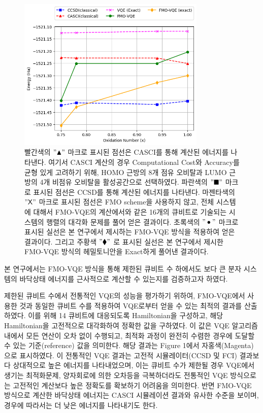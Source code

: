 \documentclass[pdflatex,sn-mathphys-num]{sn-jnl}%
\theoremstyle{thmstyleone}%
\theoremstyle{thmstyletwo}%
\theoremstyle{thmstylethree}%
\begin{document}
\begin{figure}[htbp]
\centering
\includegraphics[width=0.8\textwidth]{fig/result2.png}
\caption{빨간색의 $"\blacktriangle"$ 마크로 표시된 점선은 CASCI를 통해 계산된 에너지를 나타낸다. 여기서 CASCI 계산의 경우 Computational Cost와 Accuracy를 균형 있게 고려하기 위해, HOMO 근방의 8개 점유 오비탈과 LUMO 근방의 4개 비점유 오비탈을 활성공간으로 선택하였다. 
파란색의 $"\blacksquare"$ 마크로 표시된 점선은 CCSD를 통해 계산된 에너지를 나타낸다. 
마젠타색의 $"\mathsf{X} "$ 마크로 표시된 점선은 FMO scheme을 사용하지 않고, 전체 시스템에 대해서 FMO-VQE의 계산에서와 같은 16개의 큐비트로 기술되는 시스템의 행렬의 대각화 문제를 풀어 얻은 결과이다. 
초록색의 $"\bullet  "$ 마크로 표시된 실선은 본 연구에서 제시하는 FMO-VQE 방식을 적용하여 얻은 결과이다. 
그리고 주황색 $"\blacklozenge "$ 로 표시된 실선은 본 연구에서 제시한 FMO-VQE 방식의 헤밀토니안을 Exact하게 풀어낸 결과이다.}\label{Fig.5}
\end{figure}

본 연구에서는 FMO-VQE 방식을 통해 제한된 큐비트 수 하에서도 보다 큰 분자 시스템의 바닥상태 에너지를 근사적으로 계산할 수 있는지를 검증하고자 하였다. 

제한된 큐비트 수에서 전통적인 VQE의 성능을 평가하기 위하여, FMO-VQE에서 사용한 것과 동일한 큐비트 수를 적용하여 VQE로부터 얻을 수 있는 최적의 결과를 산출하였다. 이를 위해 14 큐비트에 대응되도록 Hamiltonian을 구성하고, 해당 Hamiltonian을 고전적으로 대각화하여 정확한 값을 구하였다. 이 값은 VQE 알고리즘 내에서 모든 연산이 오차 없이 수행되고, 최적화 과정이 완전히 수렴한 경우에 도달할 수 있는 기준(reference) 값을 의미한다. 해당 결과는 Figure 1에서 자홍색(Magenta)으로 표시하였다. 이 전통적인 VQE 결과는 고전적 시뮬레이터(CCSD 및 FCI) 결과보다 상대적으로 높은 에너지를 나타내었으며, 이는 큐비트 수가 제한될 경우 VQE에서 생기는 최적화문제, 양자회로에 의한 오차등을 극복하더라도 전통적인 VQE 방식으로는 고전적인 계산보다 높은 정확도를 확보하기 어려움을 의미한다. 반면 FMO-VQE 방식으로 계산한 바닥상태 에너지는 CASCI 시뮬레이션 결과와 유사한 수준을 보이며, 경우에 따라서는 더 낮은 에너지를 나타내기도 한다. 
\end{document}
